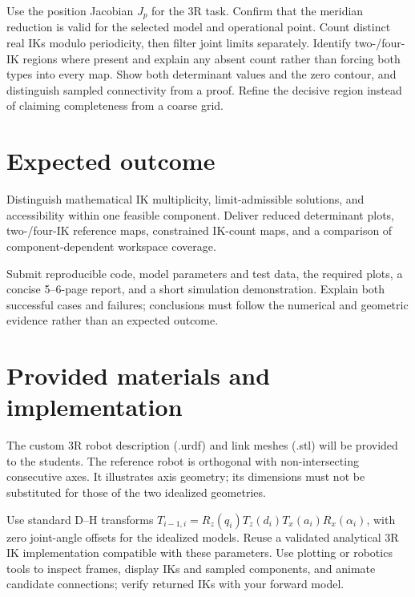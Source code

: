 \documentclass[11pt,a4paper]{article}
\begin{document}
Use the position Jacobian $J_p$ for the 3R task.
Confirm that the meridian reduction is valid for the selected model and
operational point. Count distinct real IKs modulo periodicity, then filter
joint limits separately. Identify two-/four-IK regions where present and
explain any absent count rather than forcing both types into every map. Show both determinant values and the zero contour,
and distinguish sampled connectivity from a proof. Refine the decisive
region instead of claiming completeness from a coarse grid.

\section*{Expected outcome}
Distinguish mathematical IK multiplicity, limit-admissible solutions, and
accessibility within one feasible component. Deliver reduced determinant plots,
two-/four-IK reference maps, constrained IK-count maps, and a comparison of
component-dependent workspace coverage.

Submit reproducible code, model parameters and test data, the required plots,
a concise 5--6-page report, and a short simulation demonstration. Explain
both successful cases and failures; conclusions must follow the numerical
and geometric evidence rather than an expected outcome.

\section*{Provided materials and implementation}
The custom 3R robot description (.urdf) and link meshes (.stl) will be provided
to the students. The reference robot is orthogonal with non-intersecting
consecutive axes. It illustrates axis geometry; its dimensions must not be
substituted for those of the two idealized geometries.

Use standard D--H transforms
$T_{i-1,i}=R_z(q_i)T_z(d_i)T_x(a_i)R_x(\alpha_i)$, with zero joint-angle
offsets for the idealized models. Reuse a validated analytical 3R IK
implementation compatible with these parameters. Use plotting or robotics
tools to inspect frames, display IKs and sampled components, and animate
candidate connections; verify returned IKs with your forward model.
\end{document}
